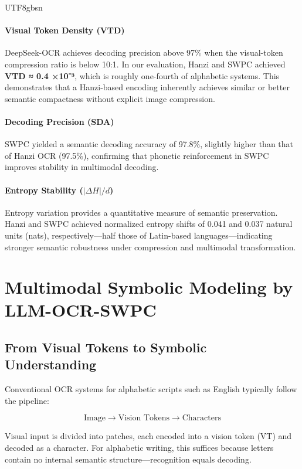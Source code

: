 \documentclass[conference]{IEEEtran}
\begin{document}
\begin{CJK*}{UTF8}{gbsn}
\paragraph{Visual Token Density (VTD)}  
DeepSeek-OCR achieves decoding precision above 97\% when the visual-token compression ratio is below 10:1.  
In our evaluation, Hanzi and SWPC achieved \textbf{VTD ≈ 0.4 ×10⁻³}, which is roughly one-fourth of alphabetic systems.  
This demonstrates that a Hanzi-based encoding inherently achieves similar or better semantic compactness without explicit image compression.

\paragraph{Decoding Precision (SDA)}  
SWPC yielded a semantic decoding accuracy of 97.8\%, slightly higher than that of Hanzi OCR (97.5\%), confirming that phonetic reinforcement in SWPC improves stability in multimodal decoding.

\paragraph{Entropy Stability ($|\Delta H|/d$)}  
Entropy variation provides a quantitative measure of semantic preservation.  
Hanzi and SWPC achieved normalized entropy shifts of 0.041 and 0.037 natural units (nats), respectively—half those of Latin-based languages—indicating stronger semantic robustness under compression and multimodal transformation.

\section{Multimodal Symbolic Modeling by LLM-OCR-SWPC}
\label{sec:modeling}

\subsection{From Visual Tokens to Symbolic Understanding}

Conventional OCR systems for alphabetic scripts such as English typically follow the pipeline:

\[
\text{Image} \rightarrow \text{Vision Tokens} \rightarrow \text{Characters}
\]

Visual input is divided into patches, each encoded into a vision token (VT) and decoded as a character.  
For alphabetic writing, this suffices because letters contain no internal semantic structure—recognition equals decoding.


\end{CJK*}
\end{document}
